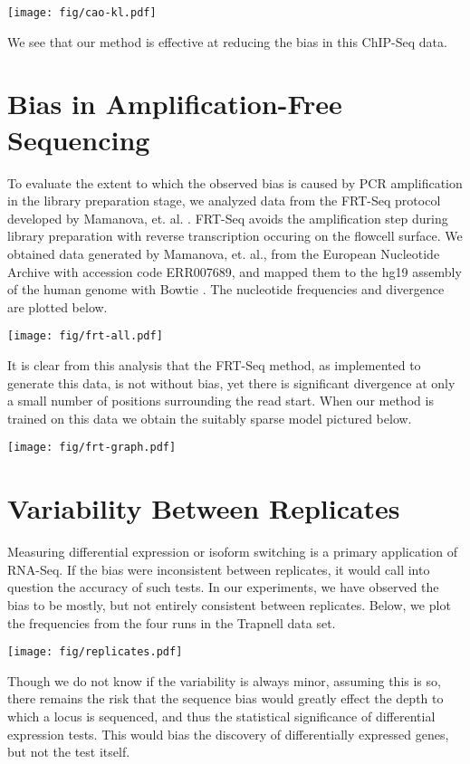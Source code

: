 \documentclass[letterpaper]{article}
\begin{document}
\begin{center}
\texttt{[image: fig/cao-kl.pdf]}
\end{center}

We see that our method is effective at reducing the bias in this ChIP-Seq data.



\section{Bias in Amplification-Free Sequencing}

To evaluate the extent to which the observed bias is caused by PCR amplification
in the library preparation stage, we analyzed data from the FRT-Seq protocol
developed by Mamanova, et. al. \cite{Mamanova2010}. FRT-Seq avoids the
amplification step during library preparation with reverse transcription
occuring on the flowcell surface. We obtained data generated by Mamanova, et.
al., from the European Nucleotide Archive with accession code ERR007689, and
mapped them to the hg19 assembly of the human genome with Bowtie
\cite{Langmead2009}. The nucleotide frequencies and divergence are plotted
below.

\begin{center}
\texttt{[image: fig/frt-all.pdf]}
\end{center}

It is clear from this analysis that the FRT-Seq method, as implemented to
generate this data, is not without bias, yet there is significant divergence at
only a small number of positions surrounding the read start. When our method is
trained on this data we obtain the suitably sparse model pictured below.

\begin{center}
\texttt{[image: fig/frt-graph.pdf]}
\end{center}



\section{Variability Between Replicates}

Measuring differential expression or isoform switching is a primary application of
RNA-Seq. If the bias were inconsistent between replicates, it would call into
question the accuracy of such tests. In our experiments, we have observed the
bias to be mostly, but not entirely consistent between replicates. Below, we
plot the frequencies from the four runs in the Trapnell data set.

\begin{center}
\texttt{[image: fig/replicates.pdf]}
\end{center}

Though we do not know if the variability is always minor, assuming this is so,
there remains the risk that the sequence bias would greatly effect the depth to
which a locus is sequenced, and thus the statistical significance of
differential expression tests. This would bias the discovery of differentially
expressed genes, but not the test itself.




\end{document}
